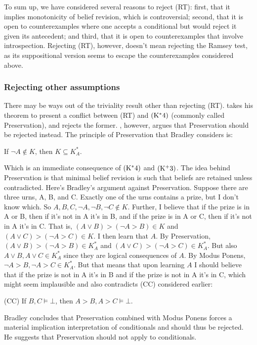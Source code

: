\documentclass[12pt]{article}
\begin{document}
To sum up, we have considered several reasons to reject (RT): first, that it implies monotonicity of belief revision, which is controversial; second, that it is open to counterexamples where one accepts a conditional but would reject it given its antecedent; and third, that it is open to counterexamples that involve introspection. Rejecting (RT), however, doesn't mean rejecting the Ramsey test, as its suppositional version seems to escape the counterexamples considered above.

\subsubsection{Rejecting other assumptions}

There may be ways out of the triviality result other than rejecting (RT). \gf{} takes his theorem to present a conflict between (RT) and $\pst{*4}$ (commonly called Preservation), and rejects the former. \brad{}, however, argues that Preservation should be rejected instead. The principle of Preservation that Bradley considers is:

If $\neg A\not\in K$, then $K \subseteq K_A^*$.

Which is an immediate consequence of $\pst{*4}$ and $\pst{+3}$. The idea behind Preservation is that minimal belief revision is such that beliefs are retained unless contradicted. Here's Bradley's argument against Preservation. Suppose there are three urns, A, B, and C. Exactly one of the urns contains a prize, but I don't know which. So $A,B,C,\neg A,\neg B,\neg C  \not\in K$. Further, I believe that if the prize is in A or B, then if it's not in A it's in B, and if the prize is in A or C, then if it's not in A it's in C. That is, $(A \lor B)>(\neg A > B) \in K$ and $(A \lor C)>(\neg A > C) \in K$. I then learn that $A$. By Preservation, $(A \lor B)>(\neg A > B) \in K_A^*$ and $(A \lor C)>(\neg A > C) \in K_A^*$. But also $A \lor B,A \lor C \in K_A^*$ since they are logical consequences of $A$. By Modus Ponens, $\neg A > B, \neg A > C \in K_A^*$. But that means that upon learning $A$ I should believe that if the prize is not in A it's in B and if the prize is not in A it's in C, which might seem implausible and also contradicts (CC) considered earlier:

(CC) If $B,C \vDash \bot$, then $A > B, A > C \vDash \bot$.

Bradley concludes that Preservation combined with Modus Ponens forces a material implication interpretation of conditionals and should thus be rejected. He suggests that Preservation should not apply to conditionals.
\end{document}
